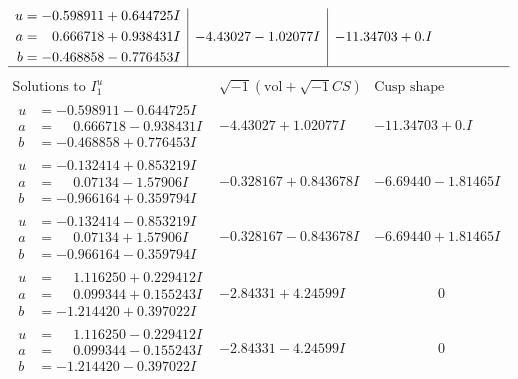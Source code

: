 \documentclass[1p]{elsarticle_modified}
\theoremstyle{definition}
\newcommand{\I}{\sqrt{-1}}
\begin{document}
$$\begin{array}{c|c|c}
\begin{aligned}
u &= -0.598911 + 0.644725 I \\
a &= \phantom{-}0.666718 + 0.938431 I \\
b &= -0.468858 - 0.776453 I\end{aligned}
 & -4.43027 - 1.02077 I & -11.34703 + 0. I\phantom{ +0.000000I}\\
 \hline 
 \end{array}$$\newpage$$\begin{array}{c|c|c}  
\text{Solutions to }I^u_{1}& \I (\text{vol} + \sqrt{-1}CS) & \text{Cusp shape}\\
 \hline 
\begin{aligned}
u &= -0.598911 - 0.644725 I \\
a &= \phantom{-}0.666718 - 0.938431 I \\
b &= -0.468858 + 0.776453 I\end{aligned}
 & -4.43027 + 1.02077 I & -11.34703 + 0. I\phantom{ +0.000000I} \\ \hline\begin{aligned}
u &= -0.132414 + 0.853219 I \\
a &= \phantom{-}0.07134 - 1.57906 I \\
b &= -0.966164 + 0.359794 I\end{aligned}
 & -0.328167 + 0.843678 I & -6.69440 - 1.81465 I \\ \hline\begin{aligned}
u &= -0.132414 - 0.853219 I \\
a &= \phantom{-}0.07134 + 1.57906 I \\
b &= -0.966164 - 0.359794 I\end{aligned}
 & -0.328167 - 0.843678 I & -6.69440 + 1.81465 I \\ \hline\begin{aligned}
u &= \phantom{-}1.116250 + 0.229412 I \\
a &= \phantom{-}0.099344 + 0.155243 I \\
b &= -1.214420 + 0.397022 I\end{aligned}
 & -2.84331 + 4.24599 I & \phantom{-0.000000 } 0 \\ \hline\begin{aligned}
u &= \phantom{-}1.116250 - 0.229412 I \\
a &= \phantom{-}0.099344 - 0.155243 I \\
b &= -1.214420 - 0.397022 I\end{aligned}
 & -2.84331 - 4.24599 I & \phantom{-0.000000 } 0 \\ \hline\begin{aligned}

\end{aligned}
\end{array}$$
\end{document}

